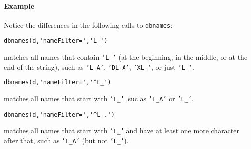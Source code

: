 \paragraph{Example}

Notice the differences in the following calls to \texttt{dbnames}:

\begin{verbatim}
dbnames(d,'nameFilter=','L_')
\end{verbatim}

matches all names that contain \texttt{'L\_'} (at the beginning, in the
middle, or at the end of the string), such as \texttt{'L\_A'},
\texttt{'DL\_A'}, \texttt{'XL\_'}, or just \texttt{'L\_'}.

\begin{verbatim}
dbnames(d,'nameFilter=','^L_')
\end{verbatim}

matches all names that start with \texttt{'L\_'}, suc as \texttt{'L\_A'}
or \texttt{'L\_'}.

\begin{verbatim}
dbnames(d,'nameFilter=','^L_.')
\end{verbatim}

matches all names that start with \texttt{'L\_'} and have at least one
more character after that, such as \texttt{'L\_A'} (but not
\texttt{'L\_'}).


